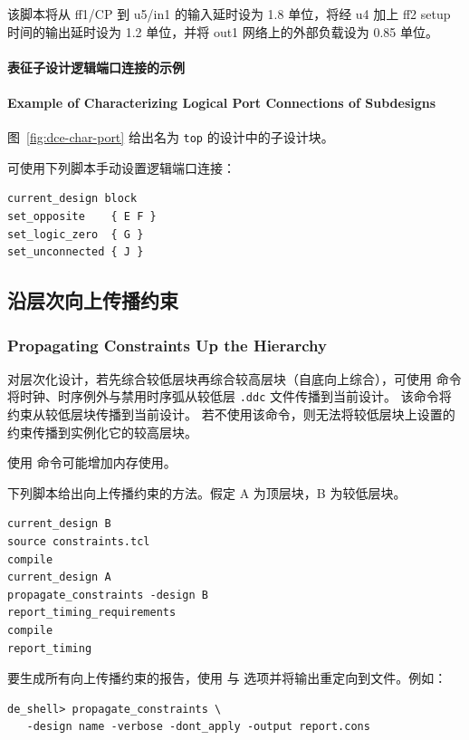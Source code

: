 该脚本将从 ff1/CP 到 u5/in1 的输入延时设为 1.8 单位，将经 u4 加上 ff2 setup 时间的输出延时设为 1.2 单位，并将 out1 网络上的外部负载设为 0.85 单位。

\paragraph{表征子设计逻辑端口连接的示例}
\paragraph*{Example of Characterizing Logical Port Connections of Subdesigns}

图~\ref{fig:dce-char-port} 给出名为 \texttt{top} 的设计中的子设计块。


可使用下列脚本手动设置逻辑端口连接：
\begin{lstlisting}
current_design block
set_opposite    { E F }
set_logic_zero  { G }
set_unconnected { J }
\end{lstlisting}

\subsection{沿层次向上传播约束}
\subsubsection*{Propagating Constraints Up the Hierarchy}

对层次化设计，若先综合较低层块再综合较高层块（自底向上综合），可使用  命令将时钟、时序例外与禁用时序弧从较低层 \texttt{.ddc} 文件传播到当前设计。
该命令将约束从较低层块传播到当前设计。
若不使用该命令，则无法将较低层块上设置的约束传播到实例化它的较高层块。

\begin{noteBox}
使用  命令可能增加内存使用。
\end{noteBox}

下列脚本给出向上传播约束的方法。假定 A 为顶层块，B 为较低层块。
\begin{lstlisting}
current_design B
source constraints.tcl
compile
current_design A
propagate_constraints -design B
report_timing_requirements
compile
report_timing
\end{lstlisting}

要生成所有向上传播约束的报告，使用  与  选项并将输出重定向到文件。例如：
\begin{lstlisting}
de_shell> propagate_constraints \
   -design name -verbose -dont_apply -output report.cons
\end{lstlisting}

